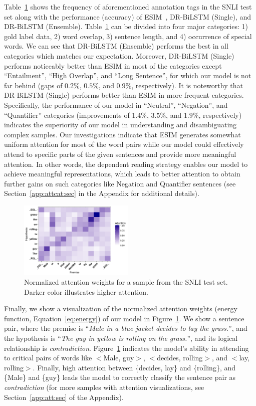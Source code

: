 \documentclass[11pt,a4paper]{article}
\begin{document}
	Table~\ref{fig:vis:att} shows the frequency of aforementioned annotation tags in the SNLI test set along with the performance (accuracy) of ESIM~\cite{him2017}, DR-BiLSTM (Single), and DR-BiLSTM (Ensemble). Table~\ref{fig:vis:att} can be divided into four major categories: 1) gold label data, 2) word overlap, 3) sentence length, and 4) occurrence of special words. We can see that DR-BiLSTM (Ensemble) performs the best in all categories which matches our expectation. Moreover, DR-BiLSTM (Single) performs noticeably better than ESIM in most of the categories except ``Entailment'', ``High Overlap'', and ``Long Sentence'', for which our model is not far behind (gaps of $0.2\%$, $0.5\%$, and $0.9\%$, respectively). It is noteworthy that DR-BiLSTM (Single) performs better than ESIM in more frequent categories. Specifically, the performance of our model in ``Neutral'', ``Negation'', and ``Quantifier'' categories (improvements of $1.4\%$, $3.5\%$, and $1.9\%$, respectively) indicates the superiority of our model in understanding and disambiguating complex samples. Our investigations indicate that ESIM generates somewhat uniform attention for most of the word pairs while our model could effectively attend to specific parts of the given sentences and provide more meaningful attention. In other words, the dependent reading strategy enables our model to achieve meaningful representations, which leads to better attention to obtain further gains on such categories like Negation and Quantifier sentences (see Section~\ref{app:attcat:sec} in the Appendix for additional details). 
	
	\begin{figure}[t]
		\centering
		\includegraphics[width=0.49\textwidth ]{43.pdf}
		\caption{Normalized attention weights for a sample from the SNLI test set. Darker color illustrates higher attention.\label{fig:vis:att}}
	\end{figure}
	
	Finally, we show a visualization of the normalized attention weights (energy function, Equation~\ref{eq:energy}) of our model in Figure~\ref{fig:vis:att}. We show a sentence pair, where the premise is ``\emph{Male in a blue jacket decides to lay the grass.}'', and the hypothesis is ``\emph{The guy in yellow is rolling on the grass.}'', and its logical relationship is \emph{contradiction}. Figure~\ref{fig:vis:att} indicates the model's ability in attending to critical pairs of words like $<$Male, guy$>$, $<$decides, rolling$>$, and $<$lay, rolling$>$. Finally, high attention between \{decides, lay\} and \{rolling\}, and \{Male\} and \{guy\} leads the model to correctly classify the sentence pair as \emph{contradiction} (for more samples with attention visualizations, see Section~\ref{app:att:sec} of the Appendix).
	
\end{document}
